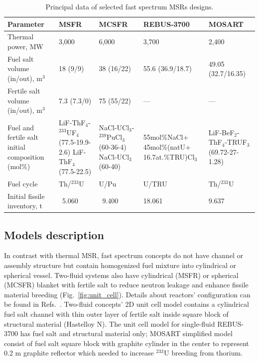 \documentclass{anstrans}
\begin{document}
\begin{table}[!htb]
  \centering
  \caption{Principal data of selected fast spectrum \glspl{MSR} designs.}
  \label{table:fsmsr_concepts} 
  \begin{tabular}{p{} p{} p{} p{} p{}} \toprule 
   Parameter & \gls{MSFR} & \gls{MCSFR} & REBUS-3700 & \gls{MOSART} \\ \midrule
   Thermal power, MW 				&  3,000 & 6,000     & 3,700 & 2,400   \\ 
   Fuel salt volume (in/out), m$^3$       &18 (9/9)& 38 (16/22)& 55.6 (36.9/18.7) & 49.05 (32.7/16.35) \\ 
   Fertile salt volume (in/out), m$^3$ & 7.3 (7.3/0) & 75 (55/22)    & --- & --- \\
   Fuel and fertile salt initial composition (mol\%) & LiF-ThF$_4$-$^{233}$UF$_4$ (77.5-19.9-2.6) LiF-ThF$_4$ \newline (77.5-22.5) & NaCl-UCl$_3$-$^{239}$PuCl$_3$ (60-36-4) \newline NaCl-UCl$_3$ \newline (60-40)    
   & 55mol\%NaCl+ 45mol\%(natU+ 16.7at.\%TRU)Cl$_3$ 
   & LiF-BeF$_2$-ThF$_4$-TRUF$_3$  \newline (69.72-27-1.28) \\
   Fuel cycle & Th/$^{233}$U & U/Pu  & U/TRU & Th/$^{233}$U \\
   Initial fissile inventory, t & \ 5.060 & \ 9.400    & 18.061 & 9.637 \\ \bottomrule 
  \end{tabular}
\end{table}

\subsection{Models description} 
\label{sec:model}
In contrast with thermal \gls{MSR}, fast spectrum concepts do not have channel or assembly structure but contain homogenized fuel mixture into cylindrical or spherical vessel. Two-fluid systems also have cylindrical (\gls{MSFR}) or spherical (\gls{MCSFR}) blanket with fertile salt to reduce neutron leakage and enhance fissile material breeding (Fig.~\ref{fig:unit_cell}). Details about reactors' configuration can be found in Refs.~\cite{noauthor_final_2015, simmons_assessment_1974, mourogov_potentialities_2006,ignatiev_molten_2014}. Two-fluid concepts' 2D unit cell model contains a cylindrical fuel salt channel with thin outer layer of fertile salt inside square block of structural material (Hastelloy N). The unit cell model for single-fluid REBUS-3700 has fuel salt and structural material only; \gls{MOSART} simplified model consist of fuel salt square block with graphite cylinder in the center to represent 0.2 m graphite reflector which needed to increase $^{233}$U breeding from thorium. 
\end{document}
